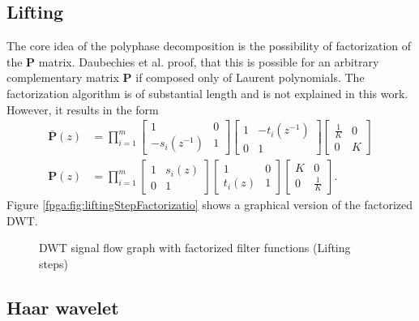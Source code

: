 \begin{refsection}
\section{Lifting}

The core idea of the polyphase decomposition is the possibility of factorization of the $\bm P$ matrix.
Daubechies et al. proof, that this is possible for an arbitrary complementary matrix $\bm P$ if composed only of Laurent polynomials.
The factorization algorithm is of substantial length and is not explained in this work.
However, it results in the form
\begin{align}
	\bm{\bar P}(z) &=
	\prod_{i=1}^{m}
	\begin{bmatrix}
		1 & 0 \\
		-s_i(z^{-1}) & 1
	\end{bmatrix}
	\begin{bmatrix}
		1 & -t_i(z^{-1}) \\
		0 & 1
	\end{bmatrix}
	\begin{bmatrix}
		\frac{1}{K} & 0 \\
		0 & K
	\end{bmatrix}
	\\
	\bm P(z) &=
	\prod_{i=1}^{m}
	\begin{bmatrix}
		1 & s_i(z) \\
		0 & 1
	\end{bmatrix}
	\begin{bmatrix}
		1 & 0 \\
		t_i(z) & 1
	\end{bmatrix}
	\begin{bmatrix}
		K & 0 \\
		0 & \frac{1}{K}
	\end{bmatrix}
	.
\end{align}
Figure \ref{fpga:fig:liftingStepFactorizatio} shows a graphical version of the factorized DWT.
\begin{figure}
	\centering
	
	
	\caption{DWT signal flow graph with factorized filter functions (Lifting steps)}
	\label{fpga:fig:liftingStepFactorization}
\end{figure}


\subsection{Haar wavelet}
\label{fpga:sec:haar}


\end{refsection}
